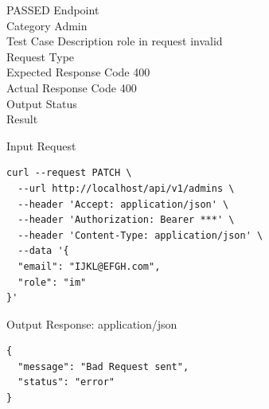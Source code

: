 \begin{testcase}{37}{PASSED}
Endpoint \hfill {}\\
Category \hfill Admin\\
Test Case Description \hfill role in request invalid\\

Request Type    \hfill {}\\
Expected Response Code    \hfill 400\\
Actual Response Code    \hfill 400\\

Output Status \hfill {}\\
Result \hfill {}

\begin{ipblock}{Input Request}
\begin{verbatim}
curl --request PATCH \
  --url http://localhost/api/v1/admins \
  --header 'Accept: application/json' \
  --header 'Authorization: Bearer ***' \
  --header 'Content-Type: application/json' \
  --data '{
  "email": "IJKL@EFGH.com",
  "role": "im"
}'
\end{verbatim}
\end{ipblock}

\begin{opblock}{Output Response: application/json}
\begin{verbatim}
{
  "message": "Bad Request sent",
  "status": "error"
}
\end{verbatim}
\end{opblock}
\end{testcase}

